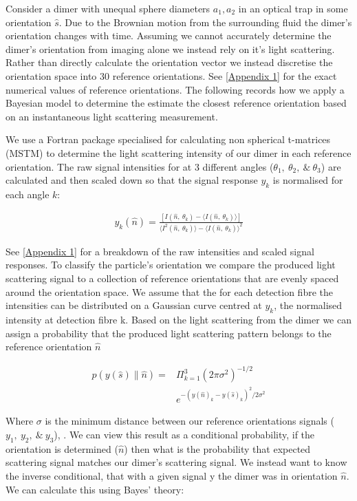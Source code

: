 \documentclass[preprint,3p]{elsarticle}
\begin{document}
Consider a dimer with unequal sphere diameters $a_1, a_2$ in an optical trap in some orientation $\hat{s}$. Due to the Brownian motion from the surrounding fluid the dimer's orientation changes with time. Assuming we cannot accurately determine the dimer's orientation from imaging alone we instead rely on it's light scattering. Rather than directly calculate the orientation vector we instead discretise the orientation space into 30 reference orientations. See \ref{Appendix 1} for the exact numerical values of reference orientations. The following records how we apply a Bayesian model to determine the estimate the closest reference orientation based on an instantaneous light scattering measurement. 

We use a Fortran package specialised for calculating non spherical t-matrices (MSTM) \cite{Mishchenko1996MSTM} to determine the light scattering intensity of our dimer in each reference orientation. The raw signal intensities for at 3 different angles ($\theta_1, \ \theta_2, \ \& \ \theta_3$) are calculated and then scaled down so that the signal response $y_k$ is normalised for each angle $k$:

\begin{align}
	y_k(\hat{n}) = 
	 \frac{\left[I(\hat{n}, \ \theta_k)- \langle I(\hat{n}, \ \theta_k) \rangle \right]} 
	{\langle I^2(\hat{n},\ \theta_k) \rangle -\langle I(\hat{n}, \ \theta_k)\rangle^2}
\end{align}

See \ref{Appendix 1} for a breakdown of the raw intensities and scaled signal responses. To classify the particle's orientation we compare the produced light scattering signal to a collection of reference orientations that are evenly spaced around the orientation space. We assume that the for each detection fibre the intensities can be distributed on a Gaussian curve centred at $y_k$, the normalised intensity at detection fibre k. Based on the light scattering from the dimer we can assign a probability that the produced light scattering pattern belongs to the reference orientation $\hat{n}$

\begin{align}
	p(y(\hat{s})\parallel\hat{n}) =& \Pi^3_{k=1}
	(2\pi\sigma^2)^{-1/2} \nonumber \\     &e^{-(y(\hat{n})_k-y(\hat{s})_k)^2/2\sigma^2}
\end{align}

Where $\sigma$ is the minimum distance between our reference orientations signals ($y_1, \ y_2, \ \& \ y_3$), . We can view this result as a conditional probability, if the orientation is determined ($\hat{n}$) then what is the probability that expected scattering signal matches our dimer's scattering signal. We instead want to know the inverse conditional, that with a given signal y the dimer was in orientation $\hat{n}$. We can calculate this using Bayes' theory:
\end{document}
